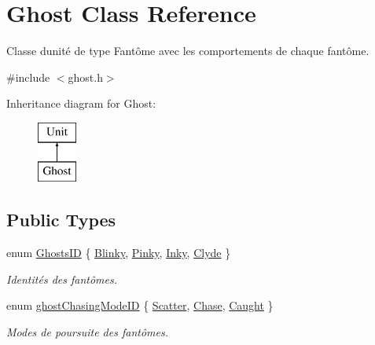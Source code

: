 \hypertarget{class_ghost}{}\section{Ghost Class Reference}
\label{class_ghost}


Classe d\textquotesingle{}unité de type Fantôme avec les comportements de chaque fantôme.  




{\ttfamily \#include $<$ghost.\+h$>$}

Inheritance diagram for Ghost\+:\begin{figure}[H]
\begin{center}
\leavevmode
\includegraphics[height=2.000000cm]{class_ghost}
\end{center}
\end{figure}
\subsection*{Public Types}
\begin{DoxyCompactItemize}
\item 
enum \hyperlink{class_ghost_adc8bee2d77e1ca0e4999cace773c71dd}{Ghosts\+I\+D} \{ \hyperlink{class_ghost_adc8bee2d77e1ca0e4999cace773c71dda41f01d04777c489d40e34d6c058c6b5b}{Blinky}, 
\hyperlink{class_ghost_adc8bee2d77e1ca0e4999cace773c71ddac04d44f7968750d812d98cb2b3699cb5}{Pinky}, 
\hyperlink{class_ghost_adc8bee2d77e1ca0e4999cace773c71dda1e770e10aa3bb3f14728210ec28ccf0c}{Inky}, 
\hyperlink{class_ghost_adc8bee2d77e1ca0e4999cace773c71dda28364f0ec8546ed1dea16de59696ab12}{Clyde}
 \}\begin{DoxyCompactList}\small\item\em Identités des fantômes. \end{DoxyCompactList}
\item 
enum \hyperlink{class_ghost_a95bc4313fdf87d827c64fe9607fcc205}{ghost\+Chasing\+Mode\+I\+D} \{ \hyperlink{class_ghost_a95bc4313fdf87d827c64fe9607fcc205a49e7cffc44104e0f3f65579a25804b63}{Scatter}, 
\hyperlink{class_ghost_a95bc4313fdf87d827c64fe9607fcc205a4e0f748a4d226742a8d524f8386fc6db}{Chase}, 
\hyperlink{class_ghost_a95bc4313fdf87d827c64fe9607fcc205ae7975f0b636e971a50a0a4285353ac0e}{Caught}
 \}\begin{DoxyCompactList}\small\item\em Modes de poursuite des fantômes. \end{DoxyCompactList}
\end{DoxyCompactItemize}
